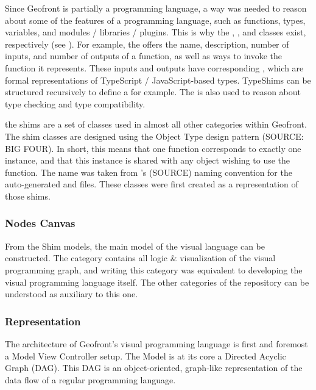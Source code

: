 Since Geofront is partially a programming language, a way was needed to reason about some of the features of a programming language, such as functions, types, variables, and modules / libraries / plugins. 
This is why the , ,  and  classes exist, respectively (see ). 
For example, the  offers the name, description, number of inputs, and number of outputs of a function, as well as ways to invoke the function it represents.
These inputs and outputs have corresponding , which are formal representations of TypeScript / JavaScript-based types. 
TypeShims can be structured recursively to define a  for example. The  is also used to reason about type checking and type compatibility.

the shims are a set of classes used in almost all other categories within Geofront. 
The shim classes are designed using the Object Type design pattern (SOURCE: BIG FOUR). 
In short, this means that one function corresponds to exactly one  instance, and that this instance is shared with any object wishing to use the function. 
The name  was taken from 's (SOURCE) naming convention for the auto-generated  and  files. These classes were first created as a representation of those shims.

\subsubsection{Nodes Canvas}
From the Shim models, the main model of the visual language can be constructed. 
The  category contains all logic \& visualization of the visual programming graph, and writing this category was equivalent to developing the visual programming language itself. 
The other categories of the repository can be understood as auxiliary to this one.

\subsubsection*{Representation}


The architecture of Geofront's visual programming language is first and foremost a Model View Controller setup. 
The Model is at its core a Directed Acyclic Graph (DAG). 
This DAG is an object-oriented, graph-like representation of the data flow of a regular programming language. 

